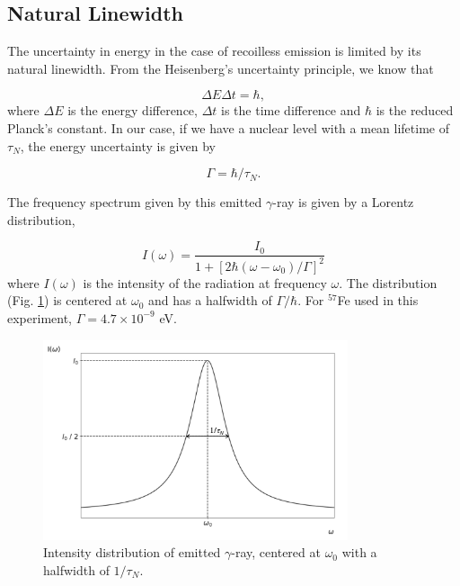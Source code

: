 \documentclass[a4paper]{report}
\numberwithin{equation}{section}
\begin{document}
\subsection{Natural Linewidth}
The uncertainty in energy in the case of recoilless emission is limited by its natural linewidth. From the Heisenberg's uncertainty principle, we know that 

\begin{equation}
		\Delta E \Delta t = \hbar,
\end{equation}
where $\Delta E $ is the energy difference, $\Delta t$ is the time difference and $\hbar $ is the reduced Planck's constant. In our case, if we have a nuclear level with a mean lifetime of $\tau _{N}$, the energy uncertainty is given by

\begin{equation} \label{eqn:uncertainty}
		\Gamma = \hbar / \tau _{N}.	
\end{equation}

The frequency spectrum given by this emitted $\gamma$-ray is given by a Lorentz distribution, 

\begin{equation}
		I (\omega) = \frac{I_{0}}{1 + [2 \hbar (\omega - \omega_{0})/\Gamma]^2}
\end{equation}
where $I(\omega)$ is the intensity of the radiation at frequency $\omega$. The distribution (Fig. \ref{fig:lorentz}) is centered at $\omega_{0}$ and has a halfwidth of $\Gamma / \hbar $. For $^{57}$Fe used in this experiment, $\Gamma = 4.7 \times 10^{-9}$ eV. 

\begin{figure}[htpb]
    \centering
    \includegraphics[width=0.8\textwidth]{lorentz}
    \caption{Intensity distribution of emitted $\gamma$-ray, centered at $\omega_{0}$ with a halfwidth of $1 / \tau _{N}$.}
    \label{fig:lorentz}
\end{figure}
\end{document}
